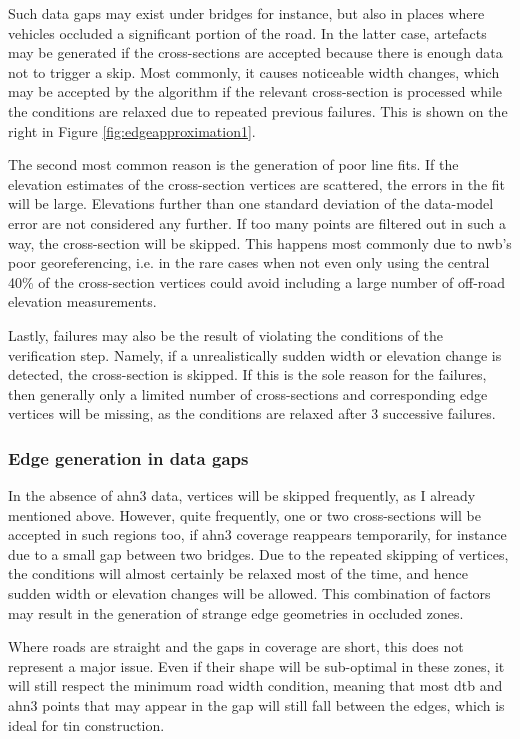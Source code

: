 Such data gaps may exist under bridges for instance, but also in places where vehicles occluded a significant portion of the road. In the latter case, artefacts may be generated if the cross-sections are accepted because there is enough data not to trigger a skip. Most commonly, it causes noticeable width changes, which may be accepted by the algorithm if the relevant cross-section is processed while the conditions are relaxed due to repeated previous failures. This is shown on the right in Figure \ref{fig:edgeapproximation1}.

The second most common reason is the generation of poor line fits. If the elevation estimates of the cross-section vertices are scattered, the errors in the fit will be large. Elevations further than one standard deviation of the data-model error are not considered any further. If too many points are filtered out in such a way, the cross-section will be skipped. This happens most commonly due to \ac{nwb}'s poor georeferencing, i.e. in the rare cases when not even only using the central 40\% of the cross-section vertices could avoid including a large number of off-road elevation measurements.

Lastly, failures may also be the result of violating the conditions of the verification step. Namely, if a unrealistically sudden width or elevation change is detected, the cross-section is skipped. If this is the sole reason for the failures, then generally only a limited number of cross-sections and corresponding edge vertices will be missing, as the conditions are relaxed after 3 successive failures.

\subsubsection{Edge generation in data gaps}

In the absence of \ac{ahn3} data, vertices will be skipped frequently, as I already mentioned above. However, quite frequently, one or two cross-sections will be accepted in such regions too, if \ac{ahn3} coverage reappears temporarily, for instance due to a small gap between two bridges. Due to the repeated skipping of vertices, the conditions will almost certainly be relaxed most of the time, and hence sudden width or elevation changes will be allowed. This combination of factors may result in the generation of strange edge geometries in occluded zones.

Where roads are straight and the gaps in coverage are short, this does not represent a major issue. Even if their shape will be sub-optimal in these zones, it will still respect the minimum road width condition, meaning that most \ac{dtb} and \ac{ahn3} points that may appear in the gap will still fall between the edges, which is ideal for \ac{tin} construction.

